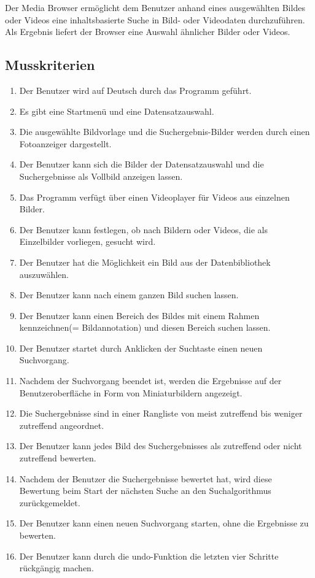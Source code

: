 Der Media Browser ermöglicht dem Benutzer anhand eines ausgewählten Bildes oder Videos eine inhaltsbasierte Suche in Bild- oder Videodaten durchzuführen. Als Ergebnis liefert der Browser eine Auswahl ähnlicher Bilder oder Videos.
\subsection{Musskriterien}
\begin{enumerate} [label=\bfseries /MK \arabic*0/]
\item Der Benutzer wird auf Deutsch durch das Programm geführt.
\item Es gibt eine Startmenü und eine Datensatzauswahl.
\item Die ausgewählte Bildvorlage und die Suchergebnis-Bilder werden durch einen Fotoanzeiger dargestellt.
\item Der Benutzer kann sich die Bilder der Datensatzauswahl und die Suchergebnisse als Vollbild anzeigen lassen.
\item Das Programm verfügt über einen Videoplayer für Videos aus einzelnen Bilder.
\item Der Benutzer kann festlegen, ob nach Bildern oder Videos, die als Einzelbilder vorliegen, gesucht wird.
\item Der Benutzer hat die Möglichkeit ein Bild aus der Datenbibliothek auszuwählen.
\item Der Benutzer kann nach einem ganzen Bild suchen lassen.
\item Der Benutzer kann einen Bereich des Bildes mit einem Rahmen kennzeichnen(= Bildannotation) und diesen Bereich suchen lassen.
\item Der Benutzer startet durch Anklicken der Suchtaste einen neuen Suchvorgang.
\item Nachdem der Suchvorgang beendet ist, werden die Ergebnisse auf der Benutzeroberfläche in Form von Miniaturbildern angezeigt.
\item Die Suchergebnisse sind in einer Rangliste von meist zutreffend bis weniger zutreffend angeordnet.
\item Der Benutzer kann jedes Bild des Suchergebnisses als zutreffend oder nicht zutreffend bewerten.
\item Nachdem der Benutzer die Suchergebnisse bewertet hat, wird diese Bewertung beim Start der nächsten Suche an den Suchalgorithmus zurückgemeldet.
\item Der Benutzer kann einen neuen Suchvorgang starten, ohne die Ergebnisse zu bewerten.
\item Der Benutzer kann durch die undo-Funktion die letzten vier Schritte rückgängig machen.

\end{enumerate}
